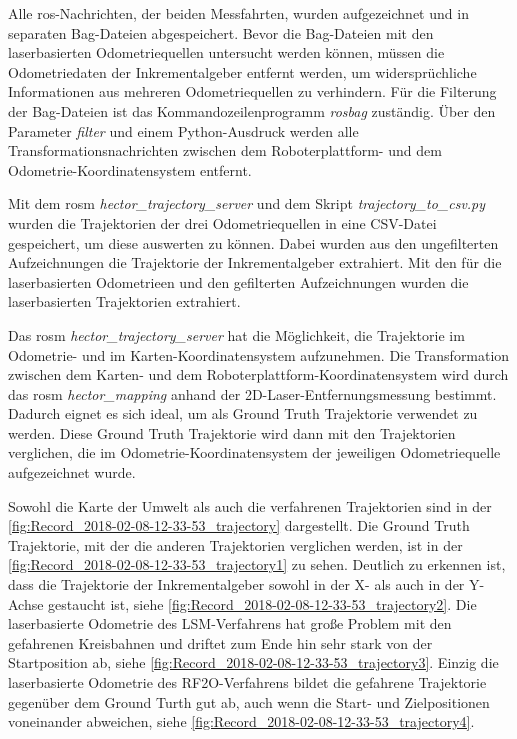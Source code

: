 Alle \gls{ros}-Nachrichten, der beiden Messfahrten, wurden aufgezeichnet und in separaten Bag-Dateien abgespeichert. Bevor die Bag-Dateien mit den laserbasierten Odometriequellen untersucht werden können, müssen die Odometriedaten der Inkrementalgeber entfernt werden, um widersprüchliche Informationen aus mehreren Odometriequellen zu verhindern. Für die Filterung der Bag-Dateien ist das Kommandozeilenprogramm \textit{rosbag} zuständig. Über den Parameter \textit{filter} und einem Python-Ausdruck werden alle Transformationsnachrichten zwischen dem Roboterplattform- und dem Odometrie-Koordinatensystem entfernt.

Mit dem \gls{rosm} \textit{hector\_trajectory\_server} und dem Skript \textit{trajectory\_to\_csv.py} wurden die Trajektorien der drei Odometriequellen in eine CSV-Datei gespeichert, um diese auswerten zu können. Dabei wurden aus den ungefilterten Aufzeichnungen die Trajektorie der Inkrementalgeber extrahiert. Mit den  für die laserbasierten Odometrieen und den gefilterten Aufzeichnungen wurden die laserbasierten Trajektorien extrahiert.

Das \gls{rosm} \textit{hector\_trajectory\_server} hat die Möglichkeit, die Trajektorie im Odometrie- und im Karten-Koordinatensystem aufzunehmen. Die Transformation zwischen dem Karten- und dem Roboterplattform-Koordinatensystem wird durch das \gls{rosm} \textit{hector\_mapping} anhand der 2D-Laser-Entfernungsmessung bestimmt. Dadurch eignet es sich ideal, um als Ground Truth Trajektorie verwendet zu werden. Diese Ground Truth Trajektorie wird dann mit den Trajektorien verglichen, die im Odometrie-Koordinatensystem der jeweiligen Odometriequelle aufgezeichnet wurde.


Sowohl die Karte der Umwelt als auch die verfahrenen Trajektorien sind in der \autoref{fig:Record_2018-02-08-12-33-53_trajectory} dargestellt. Die Ground Truth Trajektorie, mit der die anderen Trajektorien verglichen werden, ist in der \autoref{fig:Record_2018-02-08-12-33-53_trajectory1} zu sehen. Deutlich zu erkennen ist, dass die Trajektorie der Inkrementalgeber sowohl in der X- als auch in der Y-Achse gestaucht ist, siehe \autoref{fig:Record_2018-02-08-12-33-53_trajectory2}. Die laserbasierte Odometrie des LSM-Verfahrens hat große Problem mit den gefahrenen Kreisbahnen und driftet zum Ende hin sehr stark von der Startposition ab, siehe \autoref{fig:Record_2018-02-08-12-33-53_trajectory3}. Einzig die laserbasierte Odometrie des RF2O-Verfahrens bildet die gefahrene Trajektorie gegenüber dem Ground Turth gut ab, auch wenn die Start- und Zielpositionen voneinander abweichen, siehe \autoref{fig:Record_2018-02-08-12-33-53_trajectory4}.

